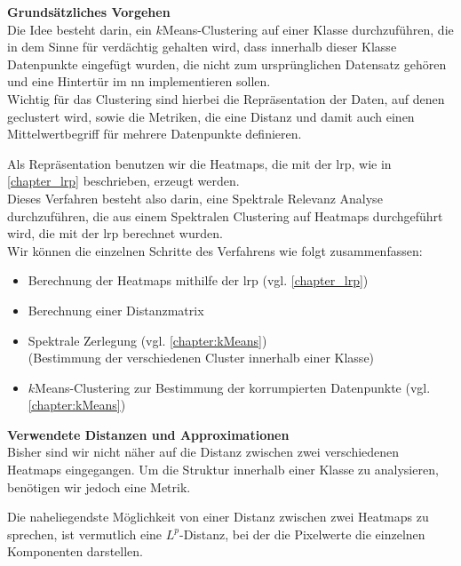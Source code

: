 \documentclass[twoside, 12pt,a4paper]{book}
\numberwithin{equation}{section}
\begin{document}
	\noindent \textbf{Grundsätzliches Vorgehen}\\
	\noindent Die Idee besteht darin, ein $k$Means-Clustering auf einer Klasse durchzuführen, die in dem Sinne für verdächtig gehalten wird, dass innerhalb dieser Klasse Datenpunkte eingefügt wurden, die nicht zum ursprünglichen Datensatz gehören und eine Hintertür im \ac{nn} implementieren sollen.\\
	
	\noindent Wichtig für das Clustering sind hierbei die Repräsentation der Daten, auf denen geclustert wird, sowie die Metriken, die eine Distanz und damit auch einen Mittelwertbegriff für mehrere Datenpunkte definieren.
	
	\noindent Als Repräsentation benutzen wir die Heatmaps, die mit der \ac{lrp}, wie in \autoref{chapter_lrp} beschrieben, erzeugt werden.\\
	
	\noindent Dieses Verfahren besteht also darin, eine Spektrale Relevanz Analyse \cite{unmaskingCH} durchzuführen, die aus einem Spektralen Clustering auf Heatmaps durchgeführt wird, die mit der \ac{lrp} berechnet wurden.\\
	
	\noindent Wir können die einzelnen Schritte des Verfahrens wie folgt zusammenfassen:	
	\begin{itemize}
		\item Berechnung der Heatmaps mithilfe der \ac{lrp} (vgl. \autoref{chapter_lrp})
		\item Berechnung einer Distanzmatrix 
		\item Spektrale Zerlegung (vgl. \autoref{chapter:kMeans})
		\\ (Bestimmung der verschiedenen Cluster innerhalb einer Klasse)
		\item $k$Means-Clustering zur Bestimmung der korrumpierten Datenpunkte (vgl. \autoref{chapter:kMeans})
	\end{itemize}
	
	
	\noindent \textbf{Verwendete Distanzen und  Approximationen}\\
	\noindent Bisher sind wir nicht näher auf die Distanz zwischen zwei verschiedenen Heatmaps eingegangen. Um die Struktur innerhalb einer Klasse zu analysieren, benötigen wir jedoch eine Metrik.
	
	\noindent Die naheliegendste Möglichkeit von einer Distanz zwischen zwei Heatmaps zu sprechen, ist vermutlich eine $L^p$-Distanz, bei der die Pixelwerte die einzelnen Komponenten darstellen. 
	
\end{document}
